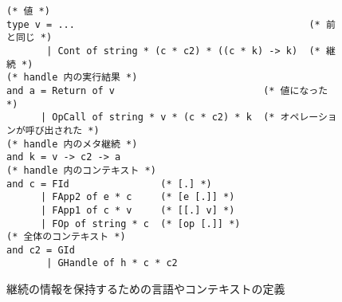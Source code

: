 \begin{figure}[t]
\begin{spacing}{0.9}
\begin{verbatim}
(* 値 *)
type v = ...                                         (* 前と同じ *)
       | Cont of string * (c * c2) * ((c * k) -> k)  (* 継続 *)
(* handle 内の実行結果 *)
and a = Return of v                          (* 値になった *)
      | OpCall of string * v * (c * c2) * k  (* オペレーションが呼び出された *)
(* handle 内のメタ継続 *)
and k = v -> c2 -> a
(* handle 内のコンテキスト *)
and c = FId                (* [.] *)
      | FApp2 of e * c     (* [e [.]] *)
      | FApp1 of c * v     (* [[.] v] *)
      | FOp of string * c  (* [op [.]] *)
(* 全体のコンテキスト *)
and c2 = GId
       | GHandle of h * c * c2
\end{verbatim}
\caption{継続の情報を保持するための言語やコンテキストの定義}
\label{figure:k_6cps}
\end{spacing}
\end{figure}

